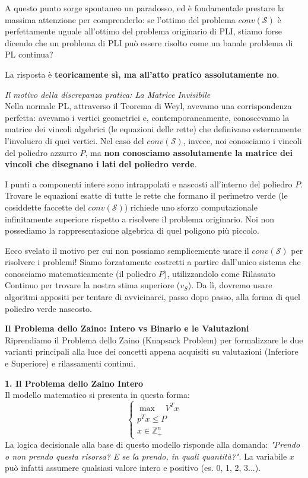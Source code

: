 \documentclass[12pt, a4paper]{article}
\begin{document}
	A questo punto sorge spontaneo un paradosso, ed è fondamentale prestare la massima attenzione per comprenderlo: se l'ottimo del problema $conv(\mathcal{S})$ è perfettamente uguale all'ottimo del problema originario di PLI, stiamo forse dicendo che un problema di PLI può essere risolto come un banale problema di PL continua? 
	
	La risposta è \textbf{teoricamente sì, ma all'atto pratico assolutamente no}.
	
	\textit{Il motivo della discrepanza pratica: La Matrice Invisibile}\\
	Nella normale PL, attraverso il Teorema di Weyl, avevamo una corrispondenza perfetta: avevamo i vertici geometrici e, contemporaneamente, conoscevamo la matrice dei vincoli algebrici (le equazioni delle rette) che definivano esternamente l'involucro di quei vertici. 
	Nel caso del $conv(\mathcal{S})$, invece, noi conosciamo i vincoli del poliedro azzurro $P$, ma \textbf{non conosciamo assolutamente la matrice dei vincoli che disegnano i lati del poliedro verde}. 
	
	I punti a componenti intere sono intrappolati e nascosti all'interno del poliedro $P$. Trovare le equazioni esatte di tutte le rette che formano il perimetro verde (le cosiddette faccette del $conv(\mathcal{S})$) richiede uno sforzo computazionale infinitamente superiore rispetto a risolvere il problema originario. Noi non possediamo la rappresentazione algebrica di quel poligono più piccolo.
	
	Ecco svelato il motivo per cui non possiamo semplicemente usare il $conv(\mathcal{S})$ per risolvere i problemi! Siamo forzatamente costretti a partire dall'unico sistema che conosciamo matematicamente (il poliedro $P$), utilizzandolo come Rilassato Continuo per trovare la nostra stima superiore ($v_S$). Da lì, dovremo usare algoritmi appositi per tentare di avvicinarci, passo dopo passo, alla forma di quel poliedro verde nascosto.
	
	\vspace{0.4cm}
	\textbf{Il Problema dello Zaino: Intero vs Binario e le Valutazioni}\\
	Riprendiamo il Problema dello Zaino (Knapsack Problem) per formalizzare le due varianti principali alla luce dei concetti appena acquisiti su valutazioni (Inferiore e Superiore) e rilassamenti continui.
	
	\vspace{0.3cm}
	\textbf{1. Il Problema dello Zaino Intero}\\
	Il modello matematico si presenta in questa forma:
	\[
	\begin{cases}
		\max \quad V^T x \\
		p^T x \leq P \\
		x \in \mathbb{Z}^n_+
	\end{cases}
	\]
	La logica decisionale alla base di questo modello risponde alla domanda: \textit{"Prendo o non prendo questa risorsa? E se la prendo, in quali quantità?"}. La variabile $x$ può infatti assumere qualsiasi valore intero e positivo (es. 0, 1, 2, 3...).
	
\end{document}
